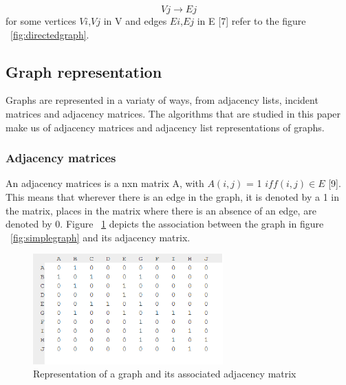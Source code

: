   \begin{equation}
    Vj\rightarrow Ej
  \end{equation} 
   for some vertices $Vi$,$Vj$ in V and edges $Ei$,$Ej$ in E [7] refer to the figure ~\ref{fig:directedgraph}.

\subsection{Graph representation}
Graphs are represented in a variaty of ways, from adjacency lists, incident matrices and adjacency matrices. The algorithms that are studied in this paper make us of adjacency matrices and adjacency list representations of graphs. 

\subsubsection{Adjacency matrices}
An adjacency matrices is a nxn matrix A, with $A(i,j)$ = 1 $iff(i,j) ∈ E$ [9]. This means that wherever there is an edge in the graph, it is denoted by a 1 in the matrix, places in the matrix where there is an absence of an edge, are denoted by 0.\newline\newline
Figure ~\ref{fig:adjacencymatrix} depicts the association between the graph in figure ~\ref{fig:simplegraph} and its adjacency matrix.
\begin{figure}[H]
  \begin{center}
      \includegraphics[width=0.65\textwidth]{matrix.png}
  \end{center}    
  \caption{Representation of a graph and its associated adjacency matrix}
  \label{fig:adjacencymatrix}
\end{figure}

